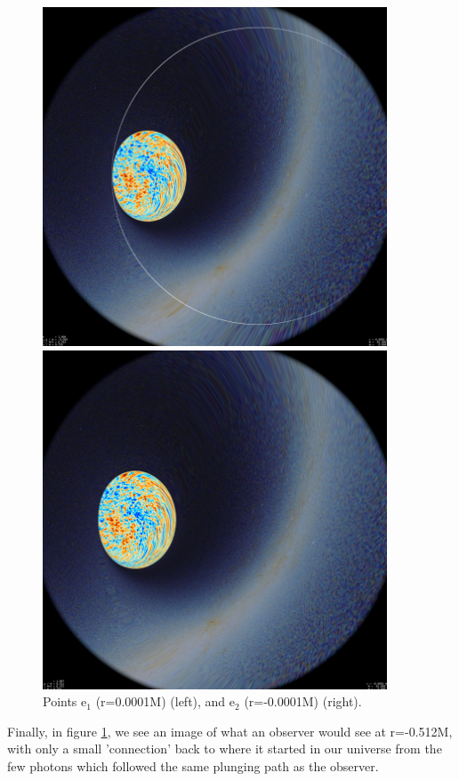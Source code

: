 \documentclass[oneside,openright,frontopenright, singlespacing]{dmathesis}
\begin{document}
\begin{figure}[!ht]
	\centering
	\begin{minipage}{0.5\textwidth}
		\centering
		\includegraphics[width=0.75\linewidth]{img/plunging5-1}
	\end{minipage}%
	\hfill
	\begin{minipage}{0.5\textwidth}
		\centering
		\includegraphics[width=0.75\linewidth]{img/plunging5-2}
	\end{minipage}
	\caption{Points e$_1$ (r=0.0001M) (left), and e$_2$ (r=-0.0001M) (right).}
	\label{fig:Figure6.6}
\end{figure}

	Finally, in figure \ref{fig:Figure6.6}, we see an image of what an observer would see at r=-0.512M, with only a small 'connection' back to where it started in our universe from the few photons which followed the same plunging path as the observer.
\end{document}
